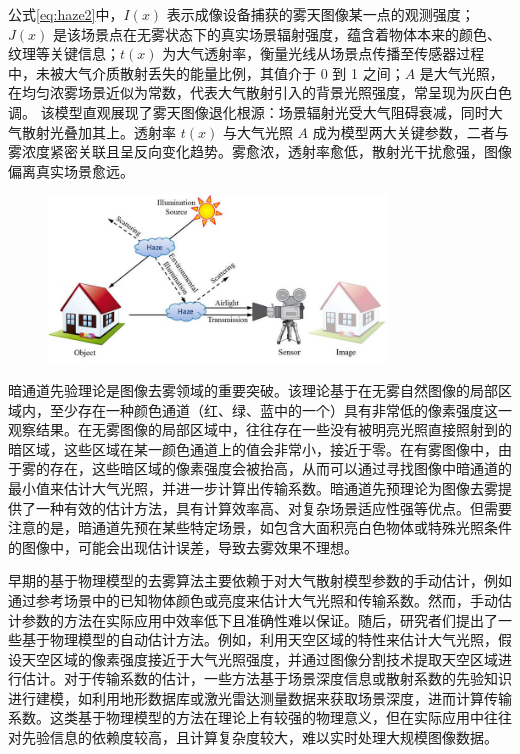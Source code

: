 公式\ref{eq:haze2}中，$I(x)$ 表示成像设备捕获的雾天图像某一点的观测强度；$J(x)$ 是该场景点在无雾状态下的真实场景辐射强度，蕴含着物体本来的颜色、纹理等关键信息；$t(x)$ 为大气透射率，衡量光线从场景点传播至传感器过程中，未被大气介质散射丢失的能量比例，其值介于 0 到 1 之间；$A$ 是大气光照，在均匀浓雾场景近似为常数，代表大气散射引入的背景光照强度，常呈现为灰白色调。
该模型直观展现了雾天图像退化根源：场景辐射光受大气阻碍衰减，同时大气散射光叠加其上。透射率 $t(x)$ 与大气光照 $A$ 成为模型两大关键参数，二者与雾浓度紧密关联且呈反向变化趋势。雾愈浓，透射率愈低，散射光干扰愈强，图像偏离真实场景愈远。

\begin{figure}[htbp]
    \centering
    \includegraphics[width=0.8\textwidth]{../figure/dehaze.png}
    \captionsetup{font=footnotesize}
    \label{fig:dehaze}
\end{figure}

暗通道先验理论是图像去雾领域的重要突破。该理论基于在无雾自然图像的局部区域内，至少存在一种颜色通道（红、绿、蓝中的一个）具有非常低的像素强度这一观察结果。在无雾图像的局部区域中，往往存在一些没有被明亮光照直接照射到的暗区域，这些区域在某一颜色通道上的值会非常小，接近于零。在有雾图像中，由于雾的存在，这些暗区域的像素强度会被抬高，从而可以通过寻找图像中暗通道的最小值来估计大气光照，并进一步计算出传输系数。暗通道先预理论为图像去雾提供了一种有效的估计方法，具有计算效率高、对复杂场景适应性强等优点。但需要注意的是，暗通道先预在某些特定场景，如包含大面积亮白色物体或特殊光照条件的图像中，可能会出现估计误差，导致去雾效果不理想。

早期的基于物理模型的去雾算法主要依赖于对大气散射模型参数的手动估计，例如通过参考场景中的已知物体颜色或亮度来估计大气光照和传输系数。然而，手动估计参数的方法在实际应用中效率低下且准确性难以保证。随后，研究者们提出了一些基于物理模型的自动估计方法。例如，利用天空区域的特性来估计大气光照，假设天空区域的像素强度接近于大气光照强度，并通过图像分割技术提取天空区域进行估计。对于传输系数的估计，一些方法基于场景深度信息或散射系数的先验知识进行建模，如利用地形数据库或激光雷达测量数据来获取场景深度，进而计算传输系数。这类基于物理模型的方法在理论上有较强的物理意义，但在实际应用中往往对先验信息的依赖度较高，且计算复杂度较大，难以实时处理大规模图像数据。


